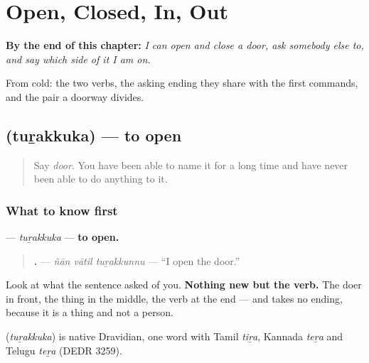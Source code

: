 
\chapter{Open, Closed, In, Out}
\label{ch:ml-open-closed}

\begin{chapteropening}
\textbf{By the end of this chapter:} \emph{I can open and close a door, ask somebody else to, and say which side of it I am on.}

From cold: the two verbs, the asking ending they share with the first commands, and the pair a doorway divides.
\end{chapteropening}

\section[\texorpdfstring{\ml{തുറക്കുക} (tuṟakkuka)}{തുറക്കുക (tuṟakkuka)}]{ (tuṟakkuka) — to open}

\label{lesson:ML-C95-thurakkuka}



\begin{quote}
Say \emph{door}. You have been able to name it for a long time and have never been able to do anything to it.
\end{quote}

\subsection*{What to know first}
\textbf{} — \emph{tuṟakkuka} — \textbf{to open.}

\begin{quote}
\textbf{  .} — \emph{ñān vātil tuṟakkunnu} — \textquotedblleft{}I open the door.\textquotedblright{}
\end{quote}

Look at what the sentence asked of you. \textbf{Nothing new but the verb.} The doer in front, the thing in the middle, the verb at the end — and \textbf{} takes no ending, because it is a thing and not a person.

\begin{cousinweb}
\textbf{} (\emph{tuṟakkuka}) is native Dravidian, one word with Tamil \emph{tiṟa}, Kannada \emph{teṟa} and Telugu \emph{teṟa} (DEDR 3259).
\end{cousinweb}

